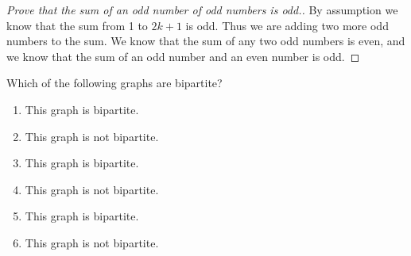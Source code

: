\documentclass[12pt]{article}
\newenvironment{modenumerate}
  {\enumerate\setupmodenumerate}
  {\endenumerate}
\newif\ifmoditem
\newcommand{\setupmodenumerate}{%
  \global\moditemfalse
  \let\origmakelabel\makelabel
  \def\moditem##1{\global\moditemtrue\def\mesymbol{##1}\item}%
  \def\makelabel##1{%
    \origmakelabel{##1\ifmoditem\rlap{\mesymbol}\fi\enspace}%
    \global\moditemfalse}%
}
\begin{document}
\begin{modenumerate}
\begin{proof}[Prove that the sum of an odd number of odd numbers is odd.]
By assumption we know that the sum from 1 to $2k+1$ is odd. Thus we are adding two more odd numbers to the
sum. We know that the sum of any two odd numbers is even, and we know that the sum of an odd number and an
even number is odd.
\end{proof}
\setcounter{enumi}{36}
\item %
Which of the following graphs are bipartite?
\begin{enumerate}
\item This graph is bipartite.
\item This graph is not bipartite.
\item This graph is bipartite.
\item This graph is not bipartite.
\item This graph is bipartite.
\item This graph is not bipartite.
\end{enumerate}
\end{modenumerate}
\setcounter{subsection}{4}
\end{document}
